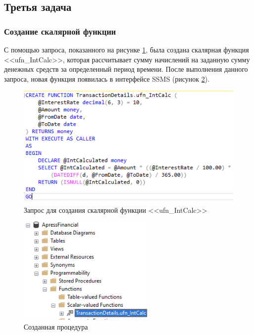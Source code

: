 \documentclass[a4paper, 14pt]{extarticle}
\begin{document}
\subsection{Третья задача}

\subsubsection{Создание скалярной функции}

С помощью запроса, показанного на рисунке \ref{fig:task-3-1}, была создана
скалярная функция <<\foreignlanguage{english}{ufn\_IntCalc}>>, которая
рассчитывает сумму начислений на заданную сумму денежных средств за определенный
период времени. После выполнения данного запроса, новая функция появилась в
интерфейсе SSMS (рисунок \ref{fig:task-3-2}).

\begin{figure}[H]
  \centering
  \includegraphics[width=\textwidth]{images/task-3/1.png}
  \caption{
    Запрос для создания скалярной функции
    <<\foreignlanguage{english}{ufn\_IntCalc}>>
  }
  \label{fig:task-3-1}
\end{figure}

\begin{figure}[H]
  \centering
  \includegraphics[width=0.6\textwidth]{images/task-3/2.png}
  \caption{Созданная процедура}
  \label{fig:task-3-2}
\end{figure}
\end{document}
